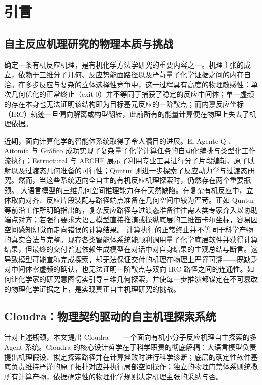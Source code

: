 \section{引言}

\subsection{自主反应机理研究的物理本质与挑战}

确定一条有机反应机理，是有机化学方法学研究的重要内容之一。机理主张的成立，依赖于三维分子几何、反应势能面路径以及严苛量子化学证据之间的内在自洽。在多步反应与复杂的立体选择性竞争中，这一过程具有高度的物理敏感性：单次几何优化的正常终止（exit 0）并不等同于捕获了稳定的反应中间体；单一虚频的存在本身也无法证明该结构即为目标基元反应的一阶鞍点；而内禀反应坐标（IRC）轨迹一旦偏向解离或构型翻转，此前所有的能量计算便在物理上失去了机理依据。

近期，面向计算化学的智能体系统取得了令人瞩目的进展。El Agente Q \citep{ref01}、Aitomia \citep{ref02} 与 Gráfico \citep{ref06} 成功实现了复杂量子化学计算任务的自动化编排与类型化工作流执行；Estructural \citep{ref04} 与 ARCHE \citep{ref05} 展示了利用专业工具进行分子片段编辑、原子映射以及过渡态几何准备的可行性；Quntur \citep{ref03} 则进一步探索了反应动力学与过渡态研究。然而，当这些系统迈向全自主的有机反应机理探索时，仍然存在两个重要瓶颈。
大语言模型的三维几何空间推理能力存在天然缺陷。在复杂有机反应中，立体取向对齐、反应片段装配与路径端点准备在几何空间中较为严苛。正如 Quntur \citep{ref03} 等前沿工作所明确指出的，复杂反应路径与过渡态准备往往需人类专家介入以协助端点对齐；若强行要求大语言模型直接推演或操纵底层的三维笛卡尔坐标，容易因空间感知幻觉而走向错误的计算结果。
计算执行的正常终止并不等同于科学产物的真实合法与完整。现存各类智能体系统能顺利调用量子化学底层软件并获得计算结果，但最终的交付普遍依赖生成模型在对话中对自身结果的主观总结与断言。这导致模型可能宣称完成探索，却无法保证交付的机理在物理上严谨可溯——既缺乏对中间体零虚频的确认，也无法证明一阶鞍点与双向 IRC 路径之间的连通性。如何让化学家的研究意图切实引导三维几何探索，并使每一步推演都锚定在不可篡改的物理化学证据之上，是实现真正自主机理研究的挑战。

\subsection{Cloudra：物理契约驱动的自主机理探索系统}

针对上述瓶颈，本文提出 Cloudra——一个面向有机小分子反应机理自主探索的多 Agent 系统。Cloudra 的核心设计哲学在于科学职责的彻底解耦：大语言模型负责提出机理假设、拟定探索路径并在计算挫败时进行科学诊断；底层的确定性软件基底负责维持严谨的原子拓扑对应并执行局部空间操作；独立的物理门禁体系则统揽所有计算产物，依据确定性的物理化学规则决定机理主张的采纳与否。


